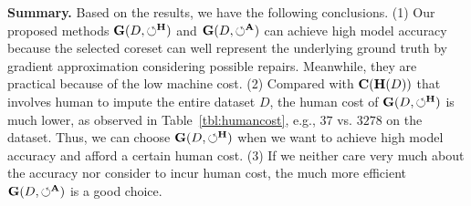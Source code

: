 \noindent \textbf{Summary.} 
Based on the results, we have the following conclusions.
(1) Our proposed methods $\mathbf{G}(D,\circlearrowleft^\mathbf{H})$ and $\mathbf{G}(D,\circlearrowleft^\mathbf{A})$ can achieve high model accuracy because the selected coreset can well represent the underlying ground truth by gradient approximation considering possible repairs. Meanwhile, they are practical because of the low machine cost. (2) Compared with $\mathbf{C}(\mathbf{H}(D))$ that involves human to impute the entire dataset $D$, the human cost of $\mathbf{G}(D,\circlearrowleft^\mathbf{H})$ is much lower, as observed in Table~\ref{tbl:humancost}, e.g., $37$ vs. $3278$ on the \nursery dataset. Thus, we can choose $\mathbf{G}(D,\circlearrowleft^\mathbf{H})$ when we want to achieve high model accuracy and afford a certain human cost. (3) 
If we neither care very much about the accuracy nor consider to incur human cost, the much more efficient $\mathbf{G}(D,\circlearrowleft^\mathbf{A})$ is a good choice.




